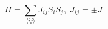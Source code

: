 \documentclass{jsarticle}
\begin{document}
\begin{equation}
  H = \sum_{\langle ij \rangle} J_{ij}S_{i}S_{j}, \; J_{ij} = \pm J
\end{equation}
\end{document}

